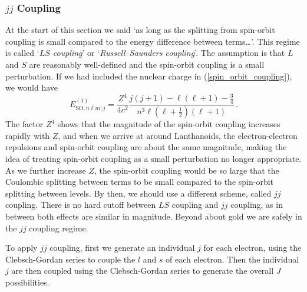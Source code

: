 \documentclass{article}
\theoremstyle{plain}\theoremheaderfont{\normalfont\itshape}\theorembodyfont{\rmfamily}\theoremseparator{.}\newtheorem*{rem}{Remark}\newtheorem*{ex}{Example}\newtheorem*{proof}{Proof}\newtheorem*{altp}{Alternative proof}
\theoremstyle{plain}\theoremheaderfont{\normalfont\bfseries}\theorembodyfont{\rmfamily}\theoremseparator{.}\newtheorem{thm}{Theorem}[section]\newtheorem{lem}[thm]{Lemma}\newtheorem{prop}[thm]{Proposition}\newtheorem*{cor}{Corollary}\newtheorem{defn}[thm]{Definition}\newtheorem{clm}[thm]{Claim}\newtheorem{clminproof}{Claim}
\theoremstyle{break}\theoremheaderfont{\normalfont\itshape}\theorembodyfont{\rmfamily}\theoremseparator{.\medskip}\newtheorem*{proofskip}{Proof}\newtheorem*{exs}{Examples}\newtheorem*{rems}{Remarks}
\theoremstyle{break}\theoremheaderfont{\normalfont\bfseries}\theorembodyfont{\rmfamily}\theoremseparator{.\medskip}\newtheorem{lemskip}[thm]{Lemma}\newtheorem{defnskip}[thm]{Definition}\newtheorem{propskip}[thm]{Proposition}\newtheorem{thmskip}[thm]{Theorem}
\numberwithin{equation}{section}
\begin{document}
    \subsubsection{\texorpdfstring{\(jj\)}{jj} Coupling}
    At the start of this section we said `as long as the splitting from spin-orbit coupling is small compared to the energy difference between terms\dots'. This regime is called `\textit{\(LS\) coupling}' or `\textit{Russell--Saunders coupling}'. The assumption is that \(L\) and \(S\) are reasonably well-defined and the spin-orbit coupling is a small perturbation. If we had included the nuclear charge in (\ref{spin_orbit_coupling}), we would have
    \begin{equation}
        E_{\text{SO},n\ell m;j}^{(1)}=\frac{Z^4}{4c^2}\frac{j(j+1)-\ell(\ell+1)-\frac{3}{4}}{n^3\ell(\ell+\frac{1}{2})(\ell+1)}\,.
    \end{equation}
    The factor \(Z^4\) shows that the magnitude of the spin-orbit coupling increases rapidly with \(Z\), and when we arrive at around Lanthanoids, the electron-electron repulsions and spin-orbit coupling are about the same magnitude, making the idea of treating spin-orbit coupling as a small perturbation no longer appropriate. As we further increase \(Z\), the spin-orbit coupling would be so large that the Coulombic splitting between terms to be small compared to the spin-orbit splitting between levels. By then, we should use a different scheme, called \(jj\) coupling. There is no hard cutoff between \(LS\) coupling and \(jj\) coupling, as in between both effects are similar in magnitude. Beyond about gold we are safely in the \(jj\) coupling regime.

    To apply \(jj\) coupling, first we generate an individual \(j\) for each electron, using the Clebsch-Gordan series to couple the \(l\) and \(s\) of each electron. Then the individual \(j\) are then coupled using the Clebsch-Gordan series to generate the overall \(J\) possibilities.
\end{document}

